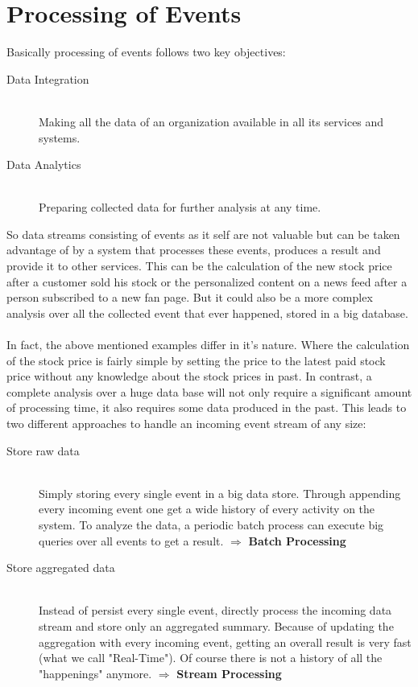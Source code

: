 \section{Processing of Events}
Basically processing of events follows two key objectives: 
\begin{description}
    \item [Data Integration] \hfill \\ Making all the data of an organization available in all its services and systems.
    \item [Data Analytics]  \hfill \\ Preparing collected data for further analysis at any time. 
\end{description}

So data streams consisting of events as it self are not valuable but
can be taken advantage of by a system that processes these events, produces a
result and provide it to other services. This can be the calculation of the new
stock price after a customer sold his stock or the personalized content on a
news feed after a person subscribed to a new fan page. But it could also be a
more complex analysis over all the collected event that ever happened, stored in
a big database. 
\\ \\
In fact, the above mentioned examples differ in it's nature. Where the
calculation of the stock price is fairly simple by setting the price to the
latest paid stock price without any knowledge about the stock prices in past. 
In contrast, a complete analysis over a huge data base will not only require a
significant amount of processing time, it also requires some data produced in the
past. This leads to two different approaches to handle an incoming event stream
of any size: 

\begin{description}
    \item[Store raw data]  \hfill \\
    {Simply storing every single event in a big data store. Through appending
    every incoming event one get a wide history of every activity on the system.
    To analyze the data, a periodic batch process can execute big queries over
    all events to get a result.  $ \Rightarrow $  \textbf{Batch Processing}}
    \item[Store aggregated data  ] \hfill \\
    {Instead of persist every single event, directly process the incoming data stream and store
    only an aggregated summary. Because of updating the aggregation with every
    incoming event, getting an overall result is very fast (what we call
    "Real-Time"). Of course there is not a history of all the "happenings"
    anymore. $ \Rightarrow $ \textbf{Stream Processing}} 
\end{description}
\cite{TalkKleppmann}


